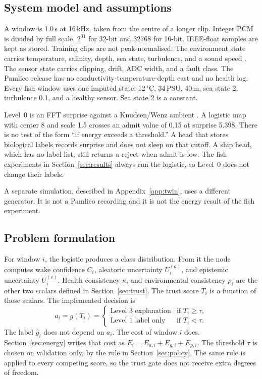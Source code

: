 \documentclass[sn-mathphys-num]{sn-jnl}%
\theoremstyle{thmstyleone}%
\theoremstyle{thmstyletwo}%
\theoremstyle{thmstylethree}%
\begin{document}
\subsection{System model and assumptions}\label{sec:model}

A window is 1.0\,s at 16\,kHz, taken from the centre of a longer clip. Integer PCM is divided by full scale, $2^{31}$ for 32-bit and 32768 for 16-bit. IEEE-float samples are kept as stored. Training clips are not peak-normalised. The environment state carries temperature, salinity, depth, sea state, turbulence, and a sound speed \cite{mackenzie1981}. The sensor state carries clipping, drift, ADC width, and a fault class. The Pamlico release has no conductivity-temperature-depth cast and no health log. Every fish window uses one imputed state: 12\,$^{\circ}$C, 34\,PSU, 40\,m, sea state 2, turbulence 0.1, and a healthy sensor. Sea state 2 is a constant.

Level~0 is an FFT surprise against a Knudsen/Wenz ambient \cite{knudsen1948,wenz1962}. A logistic map with center 8 and scale 1.5 crosses an admit value of 0.15 at surprise 5.398. There is no test of the form ``if energy exceeds a threshold.'' A head that stores biological labels records surprise and does not sleep on that cutoff. A ship head, which has no label list, still returns a reject when admit is low. The fish experiments in Section~\ref{sec:results} always run the logistic, so Level~0 does not change their labels.

A separate simulation, described in Appendix~\ref{app:twin}, uses a different generator. It is not a Pamlico recording and it is not the energy result of the fish experiment.

\subsection{Problem formulation}\label{sec:formulation}

For window $i$, the logistic produces a class distribution. From it the node computes wake confidence $C_i$, aleatoric uncertainty $U_i^{(a)}$, and epistemic uncertainty $U_i^{(e)}$. Health consistency $\kappa_i$ and environmental consistency $\rho_i$ are the other two scalars defined in Section~\ref{sec:trust}. The trust score $T_i$ is a function of those scalars. The implemented decision is
\begin{equation}
a_i = g(T_i) =
\begin{cases}
\text{Level 3 explanation} & \text{if } T_i \ge \tau, \\
\text{Level 1 label only} & \text{if } T_i < \tau.
\end{cases}
\label{eq:decision}
\end{equation}
The label $\hat{y}_i$ does not depend on $a_i$. The cost of window $i$ does. Section~\ref{sec:energy} writes that cost as $E_i = E_{a,i} + E_{g,i} + E_{p,i}$. The threshold $\tau$ is chosen on validation only, by the rule in Section~\ref{sec:policy}. The same rule is applied to every competing score, so the trust gate does not receive extra degrees of freedom.
\end{document}
